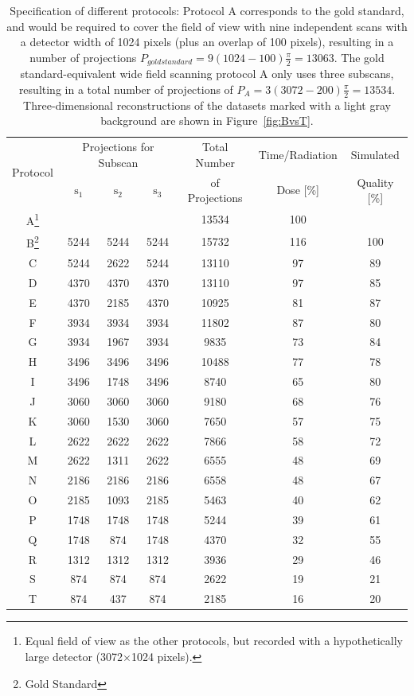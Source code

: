 \documentclass[preprint,s]{iucr}
\begin{document}
\begin{table}
	\caption{Specification of different protocols: Protocol A corresponds to the gold standard, and would be required to cover the field of view with nine independent scans with a detector width of 1024 pixels (plus an overlap of 100 pixels), resulting in a number of projections $P_{gold standard}=9(1024-100)\frac{\pi}{2}= 13063$. The gold standard-equivalent wide field scanning protocol A only uses three subscans, resulting in a total number of projections of $P_{A} = 3(3072-200)\frac{\pi}{2}= 13534$. Three-dimensional reconstructions of the datasets marked with a light gray background are shown in Figure~\ref{fig:BvsT}.}
	\label{tab:protocols}
	\begin{tabular}{ccccccc}
		\multirow{2}{*}{Protocol} & \multicolumn{3}{c}{Projections for Subscan} & Total Number & Time/Radiation & Simulated\\
                                    & $\textrm{s}_{1}$ & $\textrm{s}_{2}$ & $\textrm{s}_{3}$        & of Projections & Dose [\%] & Quality [\%]\\
		\hline
		A\footnote{Equal field of view as the other protocols, but recorded with a hypothetically large detector (3072$\times$1024 pixels).} & & & & 13534 & 100 & \\
		\rowcolor{lightgray} B\footnote{Gold Standard} & 5244 & 5244 & 5244 & 15732 & 116 & 100\\
		C & 5244 & 2622 & 5244 & 13110 &  97 & 89\\
		D & 4370 & 4370 & 4370 & 13110 &  97 & 85\\
		E & 4370 & 2185 & 4370 & 10925 &  81 & 87\\
		F & 3934 & 3934 & 3934 & 11802 &  87 & 80\\
		G & 3934 & 1967 & 3934 & 9835  &  73 & 84\\
		H & 3496 & 3496 & 3496 & 10488 &  77 & 78\\
		I & 3496 & 1748 & 3496 & 8740  &  65 & 80\\
		J & 3060 & 3060 & 3060 & 9180  &  68 & 76\\
		K & 3060 & 1530 & 3060 & 7650  &  57 & 75\\
		\rowcolor{lightgray} L  & 2622 & 2622 & 2622 & 7866  &  58 & 72\\
		M & 2622 & 1311 & 2622 & 6555  &  48 & 69\\
		N & 2186 & 2186 & 2186 & 6558  &  48 & 67\\
		O & 2185 & 1093 & 2185 & 5463  &  40 & 62\\
		P & 1748 & 1748 & 1748 & 5244  &  39 & 61\\
		Q & 1748 & 874  & 1748 & 4370  &  32 & 55\\
		R & 1312 & 1312 & 1312 & 3936  &  29 & 46\\
		S & 874  & 874  & 874  & 2622  &  19 & 21\\
		\rowcolor{lightgray} T & 874  & 437  & 874  & 2185  &  16  & 20\\
	\end{tabular}
\end{table}
\end{document}

